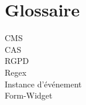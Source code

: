 \chapter{Glossaire}
\label{chap:glossary}

\begin{description}
    \item[CMS]
    \item[CAS]
    \item[RGPD]
    \item[Regex]
    \item[Instance d'événement]
    \item[Form-Widget]
\end{description}
